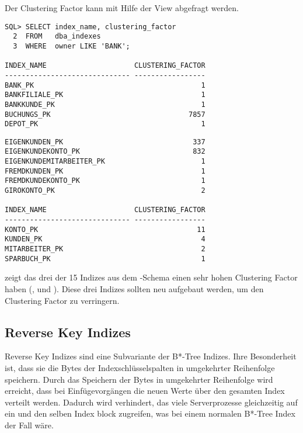          Der Clustering Factor kann mit Hilfe der View
           abgefragt werden.
          \begin{lstlisting}[caption={Den Index Clustering Factor anzeigen},label=admin319,language=oracle_sql]
SQL> SELECT index_name, clustering_factor
  2  FROM   dba_indexes
  3  WHERE  owner LIKE 'BANK';

INDEX_NAME                     CLUSTERING_FACTOR
------------------------------ -----------------
BANK_PK                                        1
BANKFILIALE_PK                                 1
BANKKUNDE_PK                                   1
BUCHUNGS_PK                                 7857
DEPOT_PK                                       1
					\end{lstlisting}
\clearpage
\begin{lstlisting}[language=oracle_sql]
EIGENKUNDEN_PK                               337
EIGENKUNDEKONTO_PK                           832
EIGENKUNDEMITARBEITER_PK                       1
FREMDKUNDEN_PK                                 1
FREMDKUNDEKONTO_PK                             1
GIROKONTO_PK                                   2

INDEX_NAME                     CLUSTERING_FACTOR
------------------------------ -----------------
KONTO_PK                                      11
KUNDEN_PK                                      4
MITARBEITER_PK                                 2
SPARBUCH_PK                                    1
\end{lstlisting}
           zeigt das drei der 15 Indizes aus dem -Schema einen sehr hohen Clustering Factor haben (,  und ). Diese drei Indizes sollten neu aufgebaut werden, um den Clustering Factor zu verringern.
      \subsection{Reverse Key Indizes}
        Reverse Key Indizes sind eine Subvariante der B*-Tree Indizes. Ihre Besonderheit ist, dass sie die Bytes der Indexschl\"usselspalten in umgekehrter Reihenfolge speichern. Durch das Speichern der Bytes in umgekehrter Reihenfolge wird erreicht, dass bei Einf\"ugevorg\"angen die neuen Werte \"uber den gesamten Index verteilt werden. Dadurch wird verhindert, das viele Serverprozesse gleichzeitig auf ein und den selben Index block zugreifen, was bei einem normalen B*-Tree Index der Fall w\"are.

